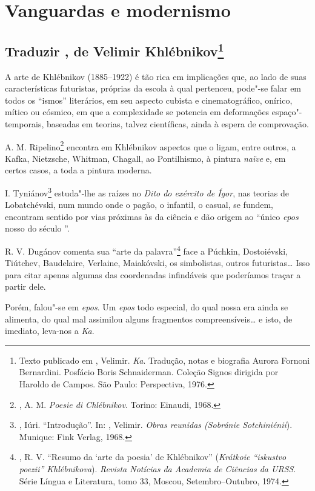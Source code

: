{\part{Vanguardas e modernismo}

\chapter{Traduzir , de Velimir Khlébnikov\footnote{Texto
  publicado em , Velimir. \emph{Ka}. Tradução, notas e
  biografia Aurora Fornoni Bernardini. Posfácio Boris Schnaiderman.
  Coleção Signos dirigida por Haroldo de Campos. São Paulo: Perspectiva,
  1976.}}

A arte de Khlébnikov (1885--1922) é tão rica em implicações que, ao lado
de suas características futuristas, próprias da escola à qual pertenceu,
pode"-se falar em todos os ``ismos'' literários, em seu aspecto cubista e
cinematográfico, onírico, mítico ou cósmico, em que a complexidade se
potencia em deformações espaço"-temporais, baseadas em teorias, talvez
científicas, ainda à espera de comprovação.

A. M. Ripelino\footnote{, A. M. \emph{Poesie di Chlébnikov}.
  Torino: Einaudi, 1968.} encontra em Khlébnikov aspectos que o ligam,
entre outros, a Kafka, Nietzsche, Whitman, Chagall, ao Pontilhismo, à
pintura \emph{naïve} e, em certos casos, a toda a pintura moderna.

I. Tyniánov\footnote{, Iúri. ``Introdução''. In: ,
  Velimir. \emph{Obras reunidas (Sobránie Sotchiniénii}).
  Munique: Fink Verlag, 1968.} estuda"-lhe as raízes no \emph{Dito do
exército de Ígor}, nas teorias de Lobatchévski, num mundo onde o pagão,
o infantil, o casual, se fundem, encontram sentido por vias próximas às
da ciência e dão origem ao ``único \emph{epos} nosso do século ''.

R. V. Dugánov comenta sua ``arte da palavra''\footnote{, R. V.
  ``Resumo da `arte da poesia' de Khlébnikov'' (\emph{Krátkoie ``iskustvo
  poezii'' Khlébnikova}). \emph{Revista Notícias da Academia de Ciências
  da URSS}. Série Língua e Literatura, tomo 33, Moscou,
  Setembro--Outubro, 1974.} face a Púchkin, Dostoiévski, Tiútchev,
Baudelaire, Verlaine, Maiakóvski, os simbolistas, outros futuristas\ldots{}
Isso para citar apenas algumas das coordenadas infindáveis que
poderíamos traçar a partir dele.

Porém, falou"-se em \emph{epos}. Um \emph{epos} todo especial, do qual
nossa era ainda se alimenta, do qual mal assimilou alguns fragmentos
compreensíveis\ldots{} e isto, de imediato, leva-nos a \emph{Ka}.

}
